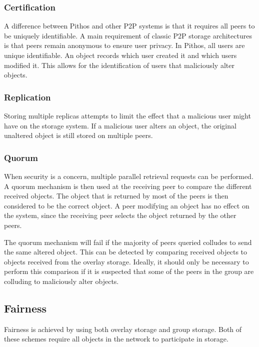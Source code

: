 \subsubsection{Certification}

A difference between Pithos and other P2P systems is that it requires all peers to be uniquely identifiable. A main requirement of classic P2P storage architectures is that peers remain anonymous to ensure user privacy. In Pithos, all users are unique identifiable. An object records which user created it and which users modified it. This allows for the identification of users that maliciously alter objects.

\subsubsection{Replication}

Storing multiple replicas attempts to limit the effect that a malicious user might have on the storage system. If a malicious user alters an object, the original unaltered object is still stored on multiple peers.

\subsubsection{Quorum}

When security is a concern, multiple parallel retrieval requests can be performed. A quorum mechanism is then used at the receiving peer to compare the different received objects. The object that is returned by most of the peers is then considered to be the correct object. A peer modifying an object has no effect on the system, since the receiving peer selects the object returned by the other peers.

The quorum mechanism will fail if the majority of peers queried colludes to send the same altered object. This can be detected by comparing received objects to objects received from the overlay storage. Ideally, it should only be necessary to perform this comparison if it is suspected that some of the peers in the group are colluding to maliciously alter objects.

\subsection{Fairness}

Fairness is achieved by using both overlay storage and group storage. Both of these schemes require all objects in the network to participate in storage.

